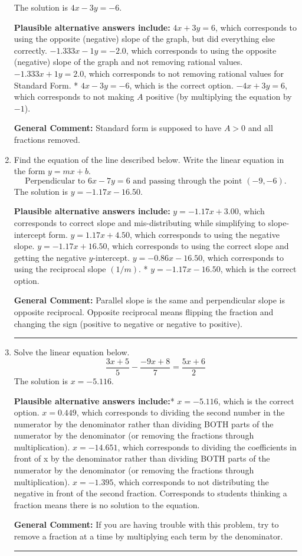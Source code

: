 \documentclass{extbook}[14pt]
\newcommand{\litem}[1]{\item #1

\rule{\textwidth}{0.4pt}}
\begin{document}
\begin{enumerate}
{The solution is \( 4x - 3y = -6 \).\begin{enumerate}[label=\Alph*.]
\textbf{Plausible alternative answers include:} $4x + 3y = 6$, which corresponds to using the opposite (negative) slope of the graph, but did everything else correctly.
 $-1.333x - 1y = -2.0$, which corresponds to using the opposite (negative) slope of the graph and not removing rational values.
 $-1.333x + 1y = 2.0$, which corresponds to not removing rational values for Standard Form.
* $4x - 3y = -6$, which is the correct option.
 $-4x + 3y = 6$, which corresponds to not making $A$ positive (by multiplying the equation by $-1$).
\end{enumerate}

\textbf{General Comment:} Standard form is supposed to have $A > 0$ and all fractions removed.
}
\litem{
Find the equation of the line described below. Write the linear equation in the form $y=mx+b$.
\[ \text{Perpendicular to } 6 x - 7 y = 6 \text{ and passing through the point } (-9, -6). \]The solution is \( y = -1.17x - 16.50 \).\begin{enumerate}[label=\Alph*.]
\textbf{Plausible alternative answers include:} $y = -1.17x + 3.00$, which corresponds to correct slope and mis-distributing while simplifying to slope-intercept form.
 $y = 1.17x + 4.50$, which corresponds to using the negative slope.
 $y = -1.17x + 16.50$, which corresponds to using the correct slope and getting the negative $y$-intercept.
 $y = -0.86x - 16.50$, which corresponds to using the reciprocal slope $(1/m)$.
* $y = -1.17x - 16.50$, which is the correct option.
\end{enumerate}

\textbf{General Comment:} Parallel slope is the same and perpendicular slope is opposite reciprocal. Opposite reciprocal means flipping the fraction and changing the sign (positive to negative or negative to positive).
}
\litem{
Solve the linear equation below.
\[ \frac{3x + 5}{5} - \frac{-9x + 8}{7} = \frac{5x + 6}{2} \]The solution is \( x = -5.116 \).\begin{enumerate}[label=\Alph*.]
\textbf{Plausible alternative answers include:}* $x = -5.116$, which is the correct option.
 $x = 0.449$, which corresponds to dividing the second number in the numerator by the denominator rather than dividing BOTH parts of the numerator by the denominator (or removing the fractions through multiplication).
 $x = -14.651$, which corresponds to dividing the coefficients in front of x by the denominator rather than dividing BOTH parts of the numerator by the denominator (or removing the fractions through multiplication).
 $x = -1.395$, which corresponds to not distributing the negative in front of the second fraction.
Corresponds to students thinking a fraction means there is no solution to the equation.
\end{enumerate}

\textbf{General Comment:} If you are having trouble with this problem, try to remove a fraction at a time by multiplying each term by the denominator.
}
\end{enumerate}
\end{document}
